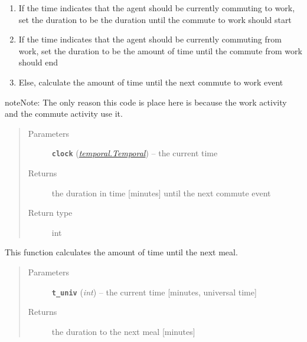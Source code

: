 \documentclass[letterpaper,10pt,english]{sphinxmanual}
\begin{document}
\begin{fulllineitems}
\begin{fulllineitems}
\begin{enumerate}
\item {} 
If the time indicates that the agent should be currently commuting to work, set the duration to be         the duration until the commute to work should start

\item {} 
If the time indicates that the agent should be currently commuting from work, set the duration to be         the amount of time until the commute from work should end

\item {} 
Else, calculate the amount of time until the next commute to work event

\end{enumerate}

\begin{notice}{note}{Note:}
The only reason this code is place here is because the work activity and the commute activity use it.
\end{notice}
\begin{quote}\begin{description}
\item[{Parameters}] \leavevmode
\textbf{\texttt{clock}} ({\hyperref[temporal:temporal.Temporal]{\emph{\emph{temporal.Temporal}}}}) -- the current time

\item[{Returns}] \leavevmode
the duration in time {[}minutes{]} until the next commute event

\item[{Return type}] \leavevmode
int

\end{description}\end{quote}

\end{fulllineitems}


\begin{fulllineitems}
\label{social:social.Social.duration_to_next_meal}
This function calculates the amount of time until the next meal.
\begin{quote}\begin{description}
\item[{Parameters}] \leavevmode
\textbf{\texttt{t\_univ}} (\emph{int}) -- the current time {[}minutes, universal time{]}

\item[{Returns}] \leavevmode
the duration to the next meal {[}minutes{]}


\end{description}
\end{quote}
\end{fulllineitems}
\end{fulllineitems}
\end{document}
